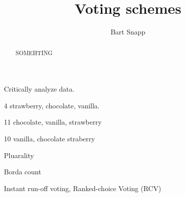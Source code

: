 \documentclass[nooutcomes,noauthor,hints]{ximera}
\title{Voting schemes}
\author{Bart Snapp}
\begin{document}
\begin{abstract}
  SOMEHTING
\end{abstract}
\maketitle

\begin{listOutcomes}
\item Critically analyze data.
\end{listOutcomes}




4 strawberry, chocolate, vanilla.

11 chocolate, vanilla, strawberry

10 vanilla, chocolate straberry






\mynewpage





\begin{question}
  Pluarality
  
\end{question}
\mynewpage



\begin{question} Borda count
\end{question}
\mynewpage



\begin{question}
  Instant run-off voting, Ranked-choice Voting (RCV) 
  
\end{question}
\mynewpage
\end{document}
